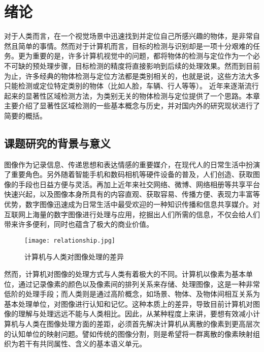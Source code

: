 

\chapter{绪论}
对于人类而言，在一个视觉场景中迅速找到并定位自己所感兴趣的物体，是非常自然且简单的事情。然而对于计算机而言，目标的检测与识别却是一项十分艰难的任务。更为重要的是，许多计算机视觉中的问题，都将物体的检测与定位作为一个必不可缺的预处理步骤，目标检测的精度将直接影响到后续的处理效果。然而到目前为止，许多经典的物体检测与定位方法都是类别相关的，也就是说，这些方法大多只能检测或定位特定类别的物体（比如人脸，车辆、行人等等）。 近年来逐渐流行起来的显著性区域检测方法，为类别无关的物体检测与定位提供了一个思路。本章主要介绍了显著性区域检测的一些基本概念与历史，并对国内外的研究现状进行了简要的概括。

\section{课题研究的背景与意义}
图像作为记录信息、传递思想和表达情感的重要媒介，在现代人的日常生活中扮演了重要角色。另外随着智能手机和数码相机等硬件设备的普及，人们创造、获取图像的手段也日益方便与灵活。再加上近年来社交网络、微博、网络相册等共享平台快速兴起，以及图像本身所具有的内容直观、获取容易、传播方便、表现力丰富等优势，数字图像迅速成为日常生活中最受欢迎的一种知识传播和信息共享媒介\cite{CMM12THU}。对互联网上海量的数字图像进行处理与应用，挖掘出人们所需的信息，不仅会给人们带来许多便利，同时也蕴含了极大的商业价值。

\begin{figure}[h]
\centering
\texttt{[image: relationship.jpg]}
\caption{计算机与人类对图像处理的差异}
\end{figure}

然而，计算机对图像的处理方式与人类有着极大的不同。计算机以像素为基本单位，通过记录像素的颜色以及像素间的排列关系来存储、处理图像，这是一种非常低阶的处理手段；而人类则是通过高阶概念，如场景、物体、及物体间相互关系为基本处理单位，对图像进行认知和记忆。这种本质上的差异，导致目前计算机对图像的理解与处理远远不能与人类相比。因此，从某种程度上来讲，要想有效减小计算机与人类在图像处理方面的差距，必须首先解决计算机从离散的像素到更高层次的认知单位的映射问题。譬如传统的图像分割，则是希望将一群离散的像素映射组织为若干有共同属性、含义的基本语义单元。

